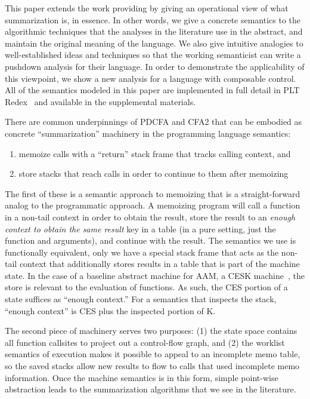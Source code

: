 This paper extends the work providing  by giving an operational view of what summarization is, in essence.
%
In other words, we give a concrete semantics to the algorithmic techniques that the analyses in the literature use in the abstract, and maintain the original meaning of the language.
%
We also give intuitive analogies to well-established ideas and techniques so that the working semanticist can write a pushdown analysis for their language.
%
In order to demonstrate the applicability of this viewpoint, we show a new analysis for a language with composable control.
%
All of the semantics modeled in this paper are implemented in full detail in PLT Redex~\citep{ianjohnson:Felleisen:2009:SEP:1795772} and available in the supplemental materials.

There are common underpinnings of PDCFA and CFA2 that can be embodied as concrete ``summarization'' machinery in the programming language semantics: 
\begin{enumerate}
\item{memoize calls with a ``return'' stack frame that tracks calling context, and}
\item{store stacks that reach calls in order to continue to them after memoizing}
\end{enumerate}

The first of these is a semantic approach to memoizing that is a straight-forward analog to the programmatic approach.
%
A memoizing program will call a function in a non-tail context in order to obtain the result, store the result to an \emph{enough context to obtain the same result} key in a table (in a pure setting, just the function and arguments), and continue with the result.
%
The semantics we use is functionally equivalent, only we have a special stack frame that acts as the non-tail context that additionally stores results in a table that is part of the machine state.
%
In the case of a baseline abstract machine for AAM, a CESK machine~\citep{dvanhorn:Felleisen1987Calculus}, the store is relevant to the evaluation of functions.
%
As such, the CES portion of a state suffices as ``enough context.''
%
For a semantics that inspects the stack, ``enough context'' is CES plus the inspected portion of K.

The second piece of machinery serves two purposes:
%
(1) the state space contains all function callsites to project out a control-flow graph, and %
(2) the worklist semantics of execution makes it possible to appeal to an incomplete memo table, so the saved stacks allow new results to flow to calls that used incomplete memo information.
%
Once the machine semantics is in this form, simple point-wise abstraction leads to the summarization algorithms that we see in the literature.

